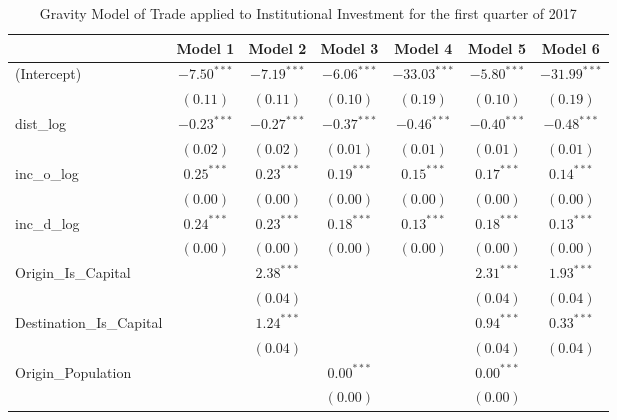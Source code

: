 \begin{table}
	\begin{center}
		\small
		\caption[Gravity Model of trade for Q1 2017]{Gravity Model of Trade applied to Institutional Investment for the first quarter of 2017}
		\begin{tabular}{l c c c c c c }
			\hline
			& Model 1 & Model 2 & Model 3 & Model 4 & Model 5 & Model 6 \\
			\hline
			(Intercept)                  & $-7.50^{***}$ & $-7.19^{***}$ & $-6.06^{***}$ & $-33.03^{***}$ & $-5.80^{***}$ & $-31.99^{***}$ \\
			& $(0.11)$      & $(0.11)$      & $(0.10)$      & $(0.19)$       & $(0.10)$      & $(0.19)$       \\
			dist\_log                    & $-0.23^{***}$ & $-0.27^{***}$ & $-0.37^{***}$ & $-0.46^{***}$  & $-0.40^{***}$ & $-0.48^{***}$  \\
			& $(0.02)$      & $(0.02)$      & $(0.01)$      & $(0.01)$       & $(0.01)$      & $(0.01)$       \\
			inc\_o\_log                  & $0.25^{***}$  & $0.23^{***}$  & $0.19^{***}$  & $0.15^{***}$   & $0.17^{***}$  & $0.14^{***}$   \\
			& $(0.00)$      & $(0.00)$      & $(0.00)$      & $(0.00)$       & $(0.00)$      & $(0.00)$       \\
			inc\_d\_log                  & $0.24^{***}$  & $0.23^{***}$  & $0.18^{***}$  & $0.13^{***}$   & $0.18^{***}$  & $0.13^{***}$   \\
			& $(0.00)$      & $(0.00)$      & $(0.00)$      & $(0.00)$       & $(0.00)$      & $(0.00)$       \\
			Origin\_Is\_Capital          &               & $2.38^{***}$  &               &                & $2.31^{***}$  & $1.93^{***}$   \\
			&               & $(0.04)$      &               &                & $(0.04)$      & $(0.04)$       \\
			Destination\_Is\_Capital     &               & $1.24^{***}$  &               &                & $0.94^{***}$  & $0.33^{***}$   \\
			&               & $(0.04)$      &               &                & $(0.04)$      & $(0.04)$       \\
			Origin\_Population           &               &               & $0.00^{***}$  &                & $0.00^{***}$  &                \\
			&               &               & $(0.00)$      &                & $(0.00)$      &                \\

\end{tabular}
\end{center}
\end{table}
